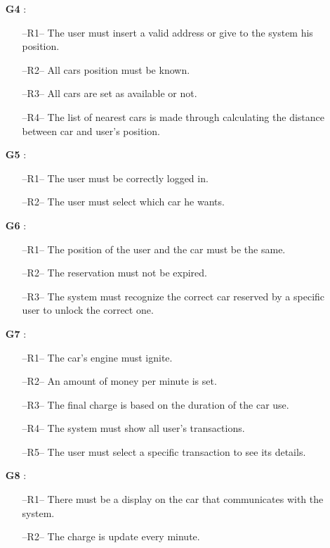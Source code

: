 \begin{itemize}
\item[\textbf{G4}]:
\begin{itemize}
\item[--R1--] The user must insert a valid address or give to the system his position.
\item[--R2--] All cars position must be known.
\item[--R3--] All cars are set as available or not.
\item[--R4--] The list of nearest cars is made through calculating the distance between car and user's position.
\end{itemize}

\item[\textbf{G5}]:
\begin{itemize}
\item[--R1--] The user must be correctly logged in.
\item[--R2--] The user must select which car he wants.
\end{itemize}

\item[\textbf{G6}]:
\begin{itemize}
\item[--R1--] The position of the user and the car must be the same.
\item[--R2--] The reservation must not be expired.
\item[--R3--] The system must recognize the correct car reserved by a specific user to unlock the correct one.
\end{itemize}

\item[\textbf{G7}]:
\begin{itemize}
\item[--R1--] The car's engine must ignite.
\item[--R2--] An amount of money per minute is set.
\item[--R3--] The final charge is based on the duration of the car use.
\item[--R4--] The system must show all user's transactions.
\item[--R5--] The user must select a specific transaction to see its details.
\end{itemize}

\item[\textbf{G8}]:
\begin{itemize}
\item[--R1--] There must be a display on the car that communicates with the system.
\item[--R2--] The charge is update every minute.
\end{itemize}


\end{itemize}
